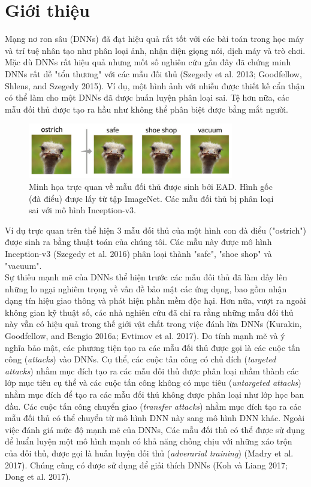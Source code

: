 \chapter{Giới thiệu}
Mạng nơ ron sâu (DNNs) đã đạt hiệu quả rất tốt với các bài toán trong học máy
và trí tuệ nhân tạo như phân loại ảnh, nhận diện giọng nói, dịch máy và trò chơi.
Mặc dù DNNs rất hiệu quả nhưng mốt số nghiên cứu gần đây đã chứng minh DNNs rất 
dễ  "tổn thương" với các mẫu đối thủ (Szegedy et al. 2013; Goodfellow, Shlens, 
and Szegedy 2015). Ví dụ, một hình ảnh với nhiễu được thiết kế cẩn thận có thể
làm cho một DNNs đã được huấn luyện phân loại sai. Tệ hơn nữa, các mẫu đối thủ
được tạo ra hầu như không thể phân biệt được bằng mắt người. 
\begin{figure}[H] %
    \centering %
    \includegraphics[width=0.8\textwidth]{assets/fig_01.png} 
    \caption{Minh họa trực quan về mẫu đối thủ được sinh bởi EAD. 
    Hình gốc (đà điểu) được lấy từ tập ImageNet. Các mẫu đối thủ bị 
    phân loại sai với mô hình Inception-v3.} %
    \label{fig:fg_01}
\end{figure}
Ví dụ trực quan trên thể hiện 3 mẫu đối thủ của một hình con đà điểu ("ostrich") 
được sinh ra bằng thuật toán của chúng tôi. Các mẫu này được mô hình Inception-v3 
(Szegedy et al. 2016) phân loại thành "safe", "shoe shop" và "vacuum". \\

Sự thiếu mạnh mẽ của DNNs thể hiện trước các mẫu đối thủ đã làm dấy lên những lo ngại 
nghiêm trọng về vấn đề bảo mật các ứng dụng, bao gồm nhận dạng tín hiệu giao thông 
và phát hiện phần mềm độc hại. Hơn nữa, vượt ra ngoài không gian kỹ thuật số, 
các nhà nghiên cứu đã chỉ ra rằng những mẫu đối thủ này vẫn có hiệu quả trong thế giới 
vật chất trong việc đánh lừa DNNs (Kurakin, Goodfellow, and Bengio 2016a; Evtimov et al. 2017).
Do tính mạnh mẽ và ý nghĩa bảo mật, các phương tiện tạo ra các mẫu đối thủ được gọi là 
các cuộc tấn công (\textit{attacks}) vào DNNs. Cụ thể, các cuộc tấn công có chủ đích 
(\textit{targeted attacks}) nhằm mục đích tạo ra các mẫu đối thủ được phân loại nhầm thành các lớp mục tiêu 
cụ thể và các cuộc tấn công không có mục tiêu (\textit{untargeted attacks}) nhằm mục đích 
để tạo ra các mẫu đối thủ không được phân loại như lớp học ban đầu. Các cuộc tấn công 
chuyển giao (\textit{transfer attacks}) nhằm mục đích tạo ra các mẫu đối thủ có thể chuyển 
từ mô hình DNN này sang mô hình DNN khác. Ngoài việc đánh giá mức độ mạnh mẽ của DNNs,
Các mẫu đối thủ có thể được sử dụng để huẩn luyện một mô hình mạnh có khả năng chống chịu 
với những xáo trộn của đối thủ, được gọi là huấn luyện đối thủ (\textit{adverarial training}) 
(Madry et al. 2017). Chúng cũng có được sử dụng để giải thích DNNs (Koh và Liang 2017;
Dong et al. 2017). \\

